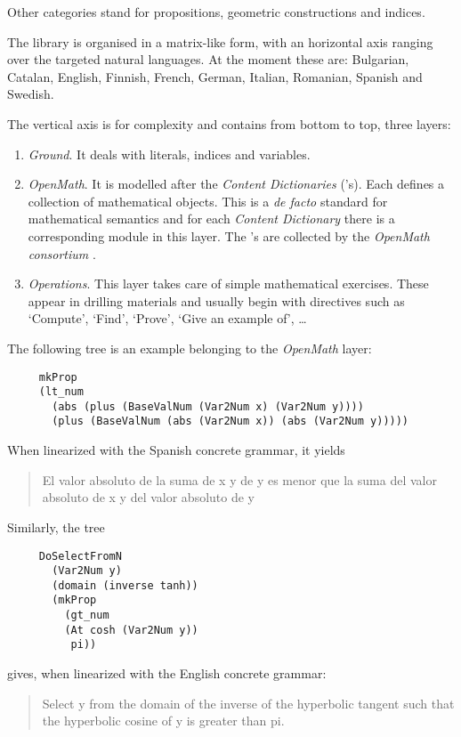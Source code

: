 \documentclass[submission,copyright,creativecommons]{eptcs}
\begin{document}
Other categories stand for propositions, geometric constructions and
indices.

The library is organised in a matrix-like form, with an horizontal axis
ranging over the targeted natural languages.  At the moment these are:
Bulgarian,
Catalan, English, Finnish, French, German, Italian, Romanian, Spanish and
Swedish.

The vertical axis is for complexity and contains from bottom to top, three
layers:

\begin{enumerate}
\item\emph{Ground}. It deals with literals, indices and variables.
\item\emph{OpenMath}. It is modelled after the \OM{ } \emph{Content
Dictionaries} (\CD's). Each \CD{} defines a collection of
mathematical objects. This is a \emph{de facto} standard for mathematical
semantics and for each \emph{Content Dictionary}
there is a corresponding module in this layer.
The \CD's are collected by the
\emph{OpenMath consortium} \cite{OpenMath}.
\item\emph{Operations}.
This layer takes care of simple mathematical exercises. These appear
in drilling materials and usually begin with directives such as
`Compute', `Find', `Prove', `Give an example of', \ldots
\end{enumerate}

The following tree is an example belonging to the \emph{OpenMath} layer:
\begin{lstlisting}
     mkProp
     (lt_num
       (abs (plus (BaseValNum (Var2Num x) (Var2Num y))))
       (plus (BaseValNum (abs (Var2Num x)) (abs (Var2Num y)))))
\end{lstlisting}
When linearized with the Spanish concrete grammar, it yields
\begin{quote}
El valor absoluto de la suma  de x y de y es menor que la suma del valor
absoluto  de x y del valor absoluto de y
\end{quote}


Similarly, the tree
\begin{lstlisting}
     DoSelectFromN
       (Var2Num y)
       (domain (inverse tanh))
       (mkProp
         (gt_num
         (At cosh (Var2Num y))
          pi))
\end{lstlisting}
gives, when linearized with the English concrete grammar:
\begin{quote}
Select y from the domain of the inverse of the hyperbolic tangent such that
the hyperbolic cosine of y is greater than pi.
\end{quote}
\end{document}
